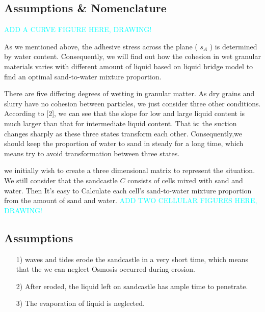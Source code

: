 \documentclass[12pt]{article}
\begin{document}
\subsection{Assumptions \& Nomenclature}
\textcolor{cyan}{ADD A CURVE FIGURE HERE, DRAWING!}
\par
As we mentioned above, the adhesive stress across the plane ( $s_A$ ) is determined by water content. Consequently, we will find out how the cohesion in wet granular materials varies with different amount of liquid based on liquid bridge model to find an optimal sand-to-water mixture proportion.
\par
There are five differing degrees of wetting in granular matter. As dry grains and slurry have no cohesion between particles, we just consider three other conditions. According to [2], we can see that the slope for low and large liquid content is much larger than that for intermediate liquid content. That is: the suction changes sharply as these three states transform each other. Consequently,we should keep the proportion of water to sand in steady for a long time, which means try to avoid transformation between three states.
\par
we initially wish to create a three dimensional matrix to represent the situation. We still consider that the sandcastle $C$ consists of cells mixed with sand and water. Then It's easy to Calculate each cell’s sand-to-water mixture proportion from the amount of sand and water.
\textcolor{cyan}{ADD TWO CELLULAR FIGURES HERE, DRAWING!}
\subsection{Assumptions}
\begin{itemize}
    \item [1)]
          waves and tides erode the sandcastle in a very short time, which means that the we can neglect Osmosis occurred during erosion.
    \item [2)]
          After eroded, the liquid left on sandcastle has ample time to penetrate.
    \item [3)]
          The evaporation of liquid is neglected.
\end{itemize}
\end{document}
